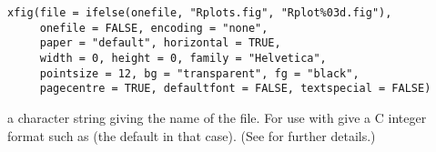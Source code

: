 %
\begin{Usage}
\begin{verbatim}
xfig(file = ifelse(onefile, "Rplots.fig", "Rplot%03d.fig"),
     onefile = FALSE, encoding = "none",
     paper = "default", horizontal = TRUE,
     width = 0, height = 0, family = "Helvetica",
     pointsize = 12, bg = "transparent", fg = "black",
     pagecentre = TRUE, defaultfont = FALSE, textspecial = FALSE)
\end{verbatim}
\end{Usage}
%
\begin{Arguments}
\begin{ldescription}
\item[\code{file}] a character string giving the name of the file.   For use
with  give a C integer format such as
 (the default in that case).
(See  for further details.)


\end{ldescription}
\end{Arguments}
